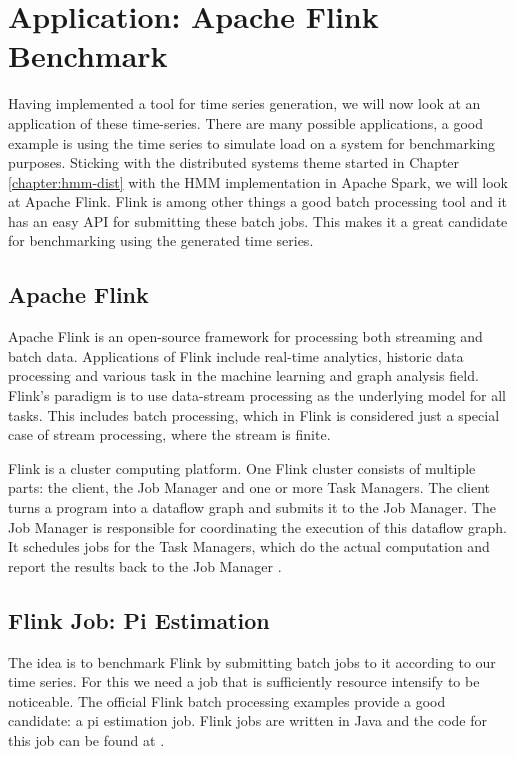 \chapter{Application: Apache Flink Benchmark}\label{chapter:benchmark}

Having implemented a tool for time series generation, we will now look at an application of these time-series. There are many possible applications, a good example is using the time series to simulate load on a system for benchmarking purposes. Sticking with the distributed systems theme started in Chapter \ref{chapter:hmm-dist} with the HMM implementation in Apache Spark, we will look at Apache Flink. Flink is among other things a good batch processing tool and it has an easy API for submitting these batch jobs. This makes it a great candidate for benchmarking using the generated time series. 

\section{Apache Flink}

Apache Flink is an open-source framework for processing both streaming and batch data. Applications of Flink include real-time analytics, historic data processing and various task in the machine learning and graph analysis field. Flink's paradigm is to use data-stream processing as the underlying model for all tasks. This includes batch processing, which in Flink is considered just a special case of stream processing, where the stream is finite. 

Flink is a cluster computing platform. One Flink cluster consists of multiple parts: the client, the Job Manager and one or more Task Managers. The client turns a program into a dataflow graph and submits it to the Job Manager. The Job Manager is responsible for coordinating the execution of this dataflow graph. It schedules jobs for the Task Managers, which do the actual computation and report the results back to the Job Manager \parencite{carbone2015apache}.

\section{Flink Job: Pi Estimation}

The idea is to benchmark Flink by submitting batch jobs to it according to our time series. For this we need a job that is sufficiently resource intensify to be noticeable. The official Flink batch processing examples provide a good candidate: a pi estimation job. Flink jobs are written in Java and the code for this job can be found at \parencite{flinkpiestim}. 

